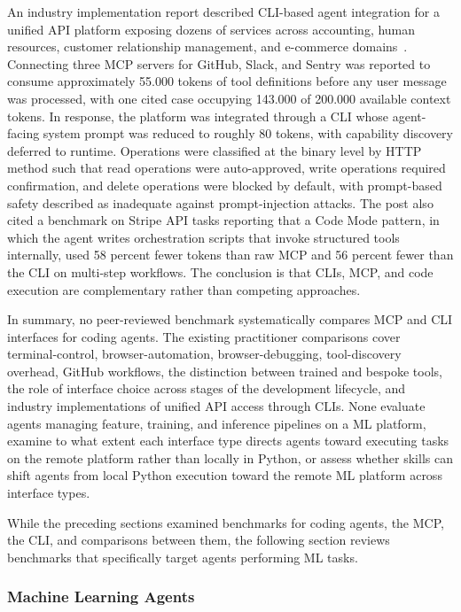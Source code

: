 \documentclass[
english,                 %
bibtex,                  %
includeExtraAbstracts, %
]{kththesis}
\numberwithin{listing}{chapter}
\begin{document}
An industry implementation report described \gls{CLI}-based agent integration for a unified \gls{API} platform exposing dozens of services across accounting, human resources, customer relationship management, and e-commerce domains~\cite{amzani_your_2026}. Connecting three \gls{MCP} servers for GitHub, Slack, and Sentry was reported to consume approximately 55.000 tokens of tool definitions before any user message was processed, with one cited case occupying 143.000 of 200.000 available context tokens. In response, the platform was integrated through a \gls{CLI} whose agent-facing system prompt was reduced to roughly 80 tokens, with capability discovery deferred to runtime. Operations were classified at the binary level by \gls{HTTP} method such that read operations were auto-approved, write operations required confirmation, and delete operations were blocked by default, with prompt-based safety described as inadequate against prompt-injection attacks. The post also cited a benchmark on Stripe \gls{API} tasks reporting that a Code Mode pattern, in which the agent writes orchestration scripts that invoke structured tools internally, used 58 percent fewer tokens than raw \gls{MCP} and 56 percent fewer than the \gls{CLI} on multi-step workflows. The conclusion is that \glspl{CLI}, \gls{MCP}, and code execution are complementary rather than competing approaches.

In summary, no peer-reviewed benchmark systematically compares \gls{MCP} and \gls{CLI} interfaces for coding agents. The existing practitioner comparisons cover terminal-control, browser-automation, browser-debugging, tool-discovery overhead, GitHub workflows, the distinction between trained and bespoke tools, the role of interface choice across stages of the development lifecycle, and industry implementations of unified \gls{API} access through \glspl{CLI}. None evaluate agents managing feature, training, and inference pipelines on a \gls{ML} platform, examine to what extent each interface type directs agents toward executing tasks on the remote platform rather than locally in Python, or assess whether skills can shift agents from local Python execution toward the remote \gls{ML} platform across interface types.

While the preceding sections examined benchmarks for coding agents, the \gls{MCP}, the \gls{CLI}, and comparisons between them, the following section reviews benchmarks that specifically target agents performing \gls{ML} tasks.

\subsubsection{Machine Learning Agents}
\end{document}
